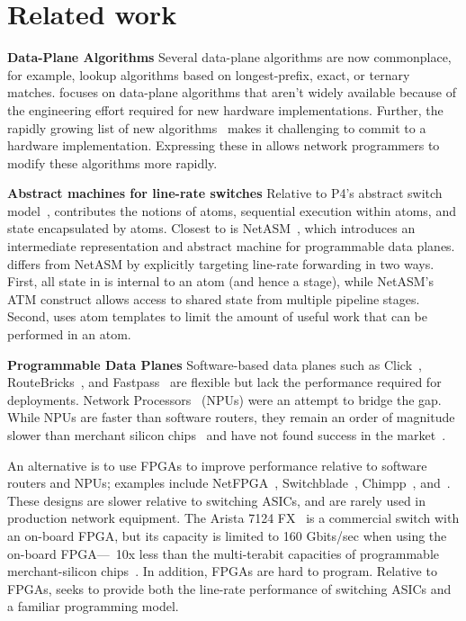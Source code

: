 \section{Related work}
\label{s:related}
\textbf{Data-Plane Algorithms}
Several data-plane algorithms are now commonplace, for example, lookup
algorithms based on longest-prefix, exact, or ternary matches.  \pktlanguage
focuses on data-plane algorithms that aren't widely available because of the
engineering effort required for new hardware implementations.  Further, the
rapidly growing list of new algorithms~\cite{pdq, d3, detail, codel, conga}
makes it challenging to commit to a hardware implementation.  Expressing these
in \pktlanguage allows network programmers to modify these algorithms more
rapidly.

\textbf{Abstract machines for line-rate switches}
Relative to P4's abstract switch model~\cite{p4}, \absmachine contributes the
notions of atoms, sequential execution within atoms, and state encapsulated by
atoms. Closest to \absmachine is NetASM~\cite{netasm}, which introduces an
intermediate representation and abstract machine for programmable data planes.
\absmachine differs from NetASM by explicitly targeting line-rate forwarding in
two ways.  First, all state in \absmachine is internal to an atom (and hence a
stage), while NetASM's ATM construct allows access to shared state from
multiple pipeline stages. Second, \absmachine uses atom templates to limit the
amount of useful work that can be performed in an atom.

\textbf{Programmable Data Planes}
Software-based data planes such as Click~\cite{click},
RouteBricks~\cite{routebricks}, and Fastpass~\cite{fastpass} are flexible but
lack the performance required for deployments. Network
Processors~\cite{ixp2800, ixp4xx} (NPUs) were an attempt to bridge the gap.
While NPUs are faster than software routers, they remain an order of magnitude
slower than merchant silicon chips~\cite{rmt} and have not found success in the
market~\cite{npfail}.

An alternative is to use FPGAs to improve performance relative to software
routers and NPUs; examples include NetFPGA~\cite{netfpga},
Switchblade~\cite{switchblade}, Chimpp~\cite{chimpp}, and~\cite{silver_bullet}.
These designs are slower relative to switching ASICs, and are rarely used in
production network equipment. The Arista 7124 FX~\cite{7124fx} is a commercial
switch with an on-board FPGA, but its capacity is limited to 160 Gbits/sec when
using the on-board FPGA---~10x less than the multi-terabit capacities of
programmable merchant-silicon chips~\cite{xpliant}. In addition, FPGAs are hard
to program. Relative to FPGAs, \pktlanguage seeks to provide both the line-rate
performance of switching ASICs and a familiar programming model.

